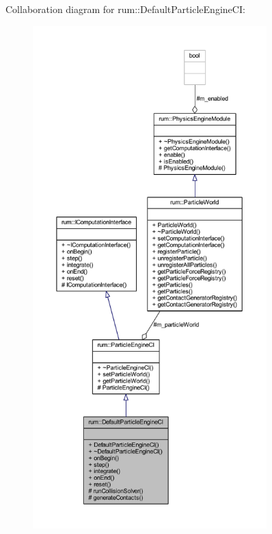Collaboration diagram for rum\+:\+:Default\+Particle\+Engine\+CI\+:\nopagebreak
\begin{figure}[H]
\begin{center}
\leavevmode
\includegraphics[height=550pt]{classrum_1_1_default_particle_engine_c_i__coll__graph}
\end{center}
\end{figure}
